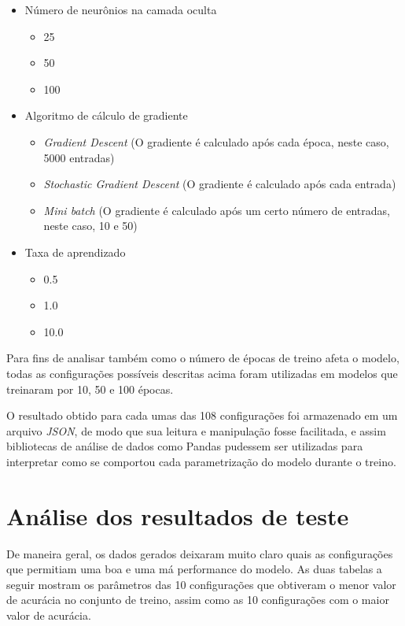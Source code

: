\documentclass{article}
\begin{document}
\begin{itemize}
    \item Número de neurônios na camada oculta
        \begin{itemize}
            \item 25
            \item 50
            \item 100
        \end{itemize}
    \item Algoritmo de cálculo de gradiente 
        \begin{itemize}
            \item \textit{Gradient Descent} (O gradiente é calculado após cada época, neste caso, 5000 entradas)
            \item \textit{Stochastic Gradient Descent} (O gradiente é calculado após cada entrada)
            \item \textit{Mini batch} (O gradiente é calculado após um certo número de entradas, neste caso, 10 e 50)
        \end{itemize}
    \item Taxa de aprendizado 
        \begin{itemize}
            \item 0.5
            \item 1.0
            \item 10.0
        \end{itemize}
\end{itemize}

Para fins de analisar também como o número de épocas de treino afeta o modelo, todas as configurações possíveis descritas acima foram utilizadas em modelos que treinaram por 10, 50 e 100 épocas.

O resultado obtido para cada umas das 108 configurações foi armazenado em um arquivo \textit{JSON}, de modo que sua leitura e manipulação fosse facilitada, e assim bibliotecas de análise de dados como Pandas pudessem ser utilizadas para interpretar
como se comportou cada parametrização do modelo durante o treino.

\section{Análise dos resultados de teste}

De maneira geral, os dados gerados deixaram muito claro quais as configurações que permitiam uma boa e uma má performance do modelo. As duas tabelas a seguir mostram os parâmetros das 10 configurações que obtiveram o menor valor de acurácia no conjunto de treino, assim como as 10 configurações com o maior valor de acurácia.
\end{document}

